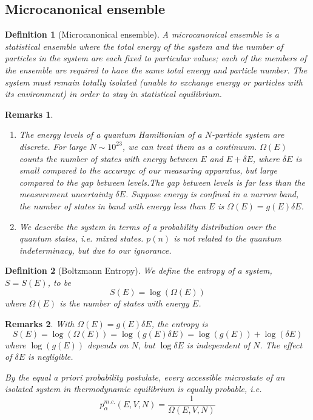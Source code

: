 \documentclass[a4paper]{article}
\newtheorem{remarks}{Remarks}[section]
\theoremstyle{new}
\newtheorem{defi}{Definition}[section]
\begin{document}
\subsection{Microcanonical ensemble}
\begin{defi}[Microcanonical ensemble]
A microcanonical ensemble is a statistical ensemble where the total energy of the system and the number of particles in the system are each fixed to particular values; each of the members of the ensemble are required to have the same total energy and particle number. The system must remain totally isolated (unable to exchange energy or particles with its environment) in order to stay in statistical equilibrium.
\end{defi}
\begin{remarks}\leavevmode
\begin{enumerate}
\item The energy levels of a quantum Hamiltonian of a $N$-particle system are discrete. For large $N\sim10^{23}$, we can treat them as a continuum. $\Omega(E)$ counts the number of states with energy between $E$ and $E+\delta E$, where $\delta E$ is small compared to the accurayc of our measuring apparatus, but large compared to the gap between levels.The gap between levels is far less than the measurement uncertainty $\delta E$. Suppose energy is confined in a narrow band, the number of states in band with energy less than $E$ is $\Omega(E)=g(E)\delta E$. 
\item We describe the system in terms of a probability distribution over the quantum states, i.e. mixed states. $p(n)$ is not related to the quantum indeterminacy, but due to our ignorance.
\end{enumerate}
\end{remarks}
\begin{defi}[Boltzmann Entropy]
We define the entropy of a system, $S=S(E)$, to be 
$$S(E)=\log(\Omega(E))$$
where $\Omega(E)$ is the number of states with energy $E$.
\end{defi}
\begin{remarks}
With $\Omega(E)=g(E)\delta E$, the entropy is
$$S(E)=\log(\Omega(E))=\log(g(E)\delta E)=\log(g(E))+\log(\delta E)$$
where $\log(g(E))$ depends on $N$, but $\log\delta E$ is independent of $N$. The effect of $\delta E$ is negligible.
\item By the equal a priori probability postulate, every accessible microstate of an isolated system in thermodynamic equilibrium is equally probable, i.e.
$$p_\alpha^{m.c.}(E,V,N)=\frac{1}{\Omega(E,V,N)}$$
\end{remarks}
\end{document}
